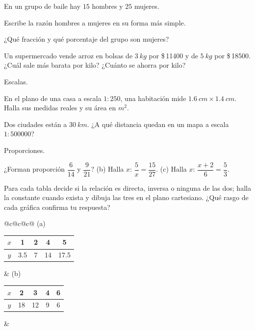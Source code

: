 \documentclass[11pt,a4paper]{article}
\newcommand{\pesos}[1]{\$\,\num{#1}}
\begin{document}
\taller
\begin{ejercicios}
\item En un grupo de baile hay $15$ hombres y $25$ mujeres.
  \begin{ejercicios}
  \item Escribe la razón hombres a mujeres en su forma más simple.
  \item ¿Qué fracción y qué porcentaje del grupo son mujeres?
  \end{ejercicios}
\item Un supermercado vende arroz en bolsas de $\SI{3}{kg}$ por \pesos{11400} y de $\SI{5}{kg}$ por \pesos{18500}.
  ¿Cuál sale más barata por kilo? ¿Cuánto se ahorra por kilo?
\item Escalas.
  \begin{ejercicios}
  \item En el plano de una casa a escala $1:250$, una habitación mide $\SI{1.6}{cm}\times\SI{1.4}{cm}$. Halla sus medidas
        reales y su área en $\si{m^2}$.
  \item Dos ciudades están a $\SI{30}{km}$. ¿A qué distancia quedan en un mapa a escala $1:\num{500000}$?
  \end{ejercicios}
\item Proporciones.
  \begin{ejercicios}
  \item ¿Forman proporción $\dfrac{6}{14}$ y $\dfrac{9}{21}$? \quad (b) Halla $x$: $\dfrac5x=\dfrac{15}{27}$.
        \quad (c) Halla $x$: $\dfrac{x+2}{6}=\dfrac53$.
  \end{ejercicios}
\item Para cada tabla decide si la relación es directa, inversa o ninguna de las dos; halla la constante cuando exista y
  dibuja las tres en el plano cartesiano. ¿Qué rasgo de cada gráfica confirma tu respuesta?
  \begin{center}\small
  \begin{tabular}{@{}c@{\hspace{10mm}}c@{\hspace{10mm}}c@{}}
  (a)\ \begin{tabular}{c|cccc} $x$ & 1 & 2 & 4 & 5\\ \hline $y$ & 3.5 & 7 & 14 & 17.5\end{tabular} &
  (b)\ \begin{tabular}{c|cccc} $x$ & 2 & 3 & 4 & 6\\ \hline $y$ & 18 & 12 & 9 & 6\end{tabular} &

\end{tabular}
\end{center}
\end{ejercicios}
\end{document}

